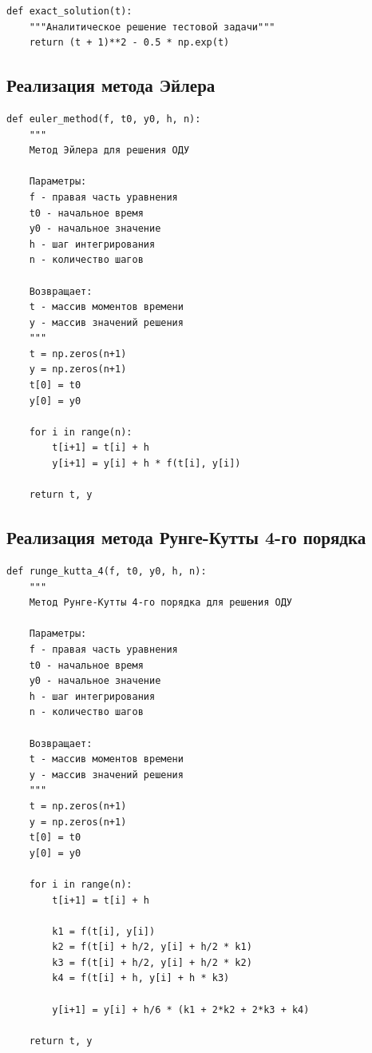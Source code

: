 \documentclass[a4paper,12pt]{article}
\begin{document}
\begin{verbatim}
def exact_solution(t):
    """Аналитическое решение тестовой задачи"""
    return (t + 1)**2 - 0.5 * np.exp(t)
\end{verbatim}

\subsection{Реализация метода Эйлера}

\begin{verbatim}
def euler_method(f, t0, y0, h, n):
    """
    Метод Эйлера для решения ОДУ
    
    Параметры:
    f - правая часть уравнения
    t0 - начальное время
    y0 - начальное значение
    h - шаг интегрирования
    n - количество шагов
    
    Возвращает:
    t - массив моментов времени
    y - массив значений решения
    """
    t = np.zeros(n+1)
    y = np.zeros(n+1)
    t[0] = t0
    y[0] = y0
    
    for i in range(n):
        t[i+1] = t[i] + h
        y[i+1] = y[i] + h * f(t[i], y[i])
    
    return t, y
\end{verbatim}

\subsection{Реализация метода Рунге-Кутты 4-го порядка}

\begin{verbatim}
def runge_kutta_4(f, t0, y0, h, n):
    """
    Метод Рунге-Кутты 4-го порядка для решения ОДУ
    
    Параметры:
    f - правая часть уравнения
    t0 - начальное время
    y0 - начальное значение
    h - шаг интегрирования
    n - количество шагов
    
    Возвращает:
    t - массив моментов времени
    y - массив значений решения
    """
    t = np.zeros(n+1)
    y = np.zeros(n+1)
    t[0] = t0
    y[0] = y0
    
    for i in range(n):
        t[i+1] = t[i] + h
        
        k1 = f(t[i], y[i])
        k2 = f(t[i] + h/2, y[i] + h/2 * k1)
        k3 = f(t[i] + h/2, y[i] + h/2 * k2)
        k4 = f(t[i] + h, y[i] + h * k3)
        
        y[i+1] = y[i] + h/6 * (k1 + 2*k2 + 2*k3 + k4)
    
    return t, y
\end{verbatim}
\end{document}
